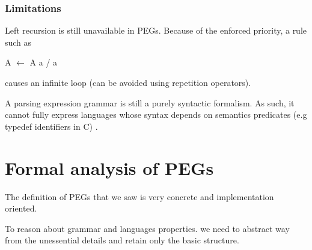 \begin{frame}
	\frametitle{Limitations}
	\begin{block}{}
		Left recursion is still unavailable in PEGs. Because of the enforced priority,  a rule such as 
		\begin{center}A $\leftarrow$ A a / a\end{center}
		causes an infinite loop (can be avoided using repetition operators).
		
	\end{block}
	\begin{block}{}
		A parsing expression grammar is still a purely syntactic formalism. As such, it cannot fully express languages whose syntax depends on semantics predicates (e.g typedef identifiers in C) .  
	\end{block}
\end{frame}

\section{Formal analysis of PEGs}

\begin{frame}
	\begin{block}{}The definition of PEGs that we saw is very concrete and implementation oriented.\end{block}
	
	\begin{block}{}To reason about grammar and languages properties. we need to abstract way from the  unessential details and retain only the basic structure.\end{block}
\end{frame}

